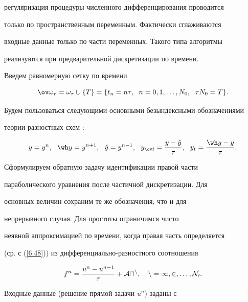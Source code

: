 регуляризация процедуры численного дифференцирования проводится


только по пространственным переменным. Фактически сглаживаются


входные данные только по части переменных. Такого типа алгоритмы


реализуются при предварительной дискретизации по времени.





Введем равномерную сетку по времени


$$


\ov\omega_\tau =


\omega_\tau\cup \{T\} =


\{t_n=n\tau,


\ \; n=0,1,\dotsc,N_0,


\ \; \tau N_0=T\} .


$$


Будем пользоваться следующими основными безындексными обозначениями


теории разностных схем \cite{b12}:


$$


y=y^n, \ \ \wh y=y^{n+1}, \ \ \check y=y^{n-1},


\ \ y_{\ov t}=\frac {y-\check y}{\tau},


\ \ y_t=\frac {\wh y-y}{\tau}.


$$





Сформулируем обратную задачу идентификации правой части


параболического уравнения после частичной дискретизации. Для


основных величин сохраним те же обозначения, что и для


непрерывного случая. Для простоты ограничимся чисто


неявной аппроксимацией по времени, когда правая часть определяется


(ср. с (\ref{6.48})) из дифференциально-разностного соотношения


\begin{equation}\label{6.61}


f^n =\frac{u^n - u^{n-1}}{\tau} + \cal{A} u^n,


\quad n = 1,2,\dotsc, N_0.


\end{equation}


Входные данные (решение прямой задачи $u^n$) заданы с


